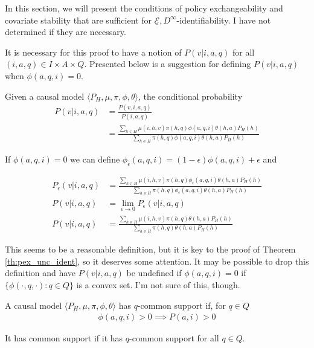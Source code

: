 In this section, we will present the conditions of policy exchangeability and covariate stability that are sufficient for $\underline{\mathscr{E}}, D^\infty$-identifiability. I have not determined if they are necessary.

It is necessary for this proof to have a notion of $P(v|i,a,q)$ for all $(i,a,q)\in I\times A\times Q$. Presented below is a suggestion for defining $P(v|i,a,q)$ when $\phi(a,q,i)=0$. 

\begin{definition}
Given a causal model $\langle P_H, \mu,\pi,\phi,\theta\rangle$, the conditional probability
\begin{align}
    P(v|i,a,q) &= \frac{P(v,i,a,q)}{P(i,a,q)} \\
               &= \frac{\sum_{h\in H} \mu(i,h,v)\pi(h,q) \phi(a,q,i) \theta(h,a) P_H(h)}{\sum_{h\in H} \pi(h,q) \phi(a,q,i) \theta(h,a) P_H(h)}
\end{align}

If $\phi(a,q,i) = 0$ we can define $\phi_\epsilon(a,q,i) = (1-\epsilon) \phi(a,q,i) + \epsilon$ and 

\begin{align}
    P_{\epsilon}(v|i,a,q) &= \frac{\sum_{h\in H} \mu(i,h,v)\pi(h,q) \phi_\epsilon(a,q,i) \theta(h,a) P_H(h)}{\sum_{h\in H} \pi(h,q) \phi_\epsilon(a,q,i) \theta(h,a) P_H(h)} \\
    P(v|i,a,q)            &= \lim_{\epsilon \to 0} P_{\epsilon}(v|i,a,q)\\
    P(v|i,a,q)            &= \frac{\sum_{h\in H} \mu(i,h,v)\pi(h,q) \theta(h,a) P_H(h)}{\sum_{h\in H} \pi(h,q) \theta(h,a) P_H(h)} \label{eq:impossible_condition}
\end{align}
\end{definition}

\begin{remark}
This seems to be a reasonable definition, but it is key to the proof of Theorem \ref{th:pex_unc_ident}, so it deserves some attention. It may be possible to drop this definition and have $P(v|i,a,q)$ be undefined if $\phi(a,q,i)=0$ if $\{\phi(\cdot,q,\cdot):q\in Q\}$ is a convex set. I'm not sure of this, though.
\end{remark}


\begin{definition}
A causal model $\langle P_H, \mu,\pi,\phi,\theta\rangle$ has $q$-common support if, for $q\in Q$
\begin{align}
    \phi(a,q,i)>0\implies P(a,i)>0
\end{align}

It has common support if it has $q$-common support for all $q\in Q$.
\end{definition}



